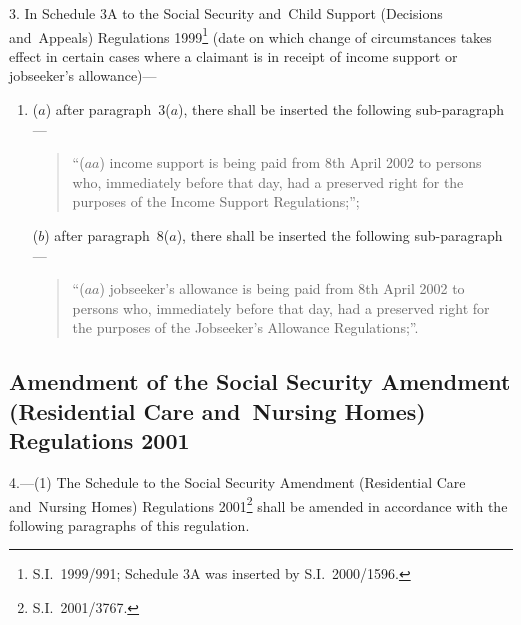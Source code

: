 \documentclass[12pt,a4paper]{article}
\begin{document}
3.  In Schedule 3A to the Social Security and~Child Support (Decisions and~Appeals) Regulations 1999\footnote{S.I.~1999/991; Schedule 3A was inserted by S.I.~2000/1596.} (date on which change of circumstances takes effect in certain cases where a claimant is in receipt of income support or jobseeker’s allowance)—
\begin{enumerate}\item[]
($a$) after paragraph~3($a$), there shall be inserted the following sub-paragraph—
\begin{quotation}
“($aa$) income support is being paid from 8th April 2002 to persons who, immediately before that day, had a preserved right for the purposes of the Income Support Regulations;”;
\end{quotation}

($b$) after paragraph~8($a$), there shall be inserted the following sub-paragraph—
\begin{quotation}
“($aa$) jobseeker’s allowance is being paid from 8th April 2002 to persons who, immediately before that day, had a preserved right for the purposes of the Jobseeker’s Allowance Regulations;”.
\end{quotation}
\end{enumerate}

\subsection[4. Amendment of the Social Security Amendment (Residential Care and~Nursing Homes) Regulations 2001]{Amendment of the Social Security Amendment (Residential Care and~Nursing Homes) Regulations 2001}

4.---(1)  The Schedule to the Social Security Amendment (Residential Care and~Nursing Homes) Regulations 2001\footnote{S.I.~2001/3767.} shall be amended in accordance with the following paragraphs of this regulation.
\end{document}

